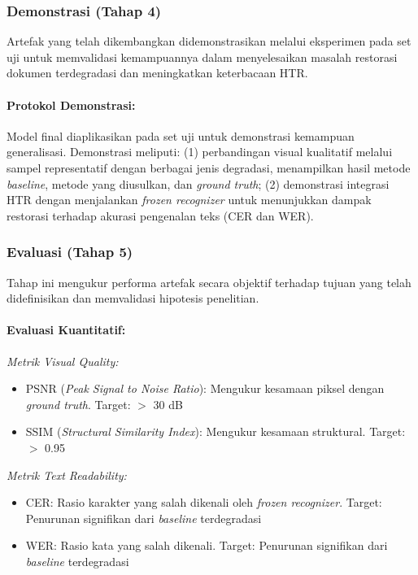 \documentclass[12pt,a4paper]{article}
\begin{document}

\subsubsection{Demonstrasi (Tahap 4)}
Artefak yang telah dikembangkan didemonstrasikan melalui eksperimen pada set uji untuk memvalidasi kemampuannya dalam menyelesaikan masalah restorasi dokumen terdegradasi dan meningkatkan keterbacaan HTR.

\paragraph{Protokol Demonstrasi:}
Model final diaplikasikan pada set uji untuk demonstrasi kemampuan generalisasi. Demonstrasi meliputi: (1) perbandingan visual kualitatif melalui sampel representatif dengan berbagai jenis degradasi, menampilkan hasil metode \textit{baseline}, metode yang diusulkan, dan \textit{ground truth}; (2) demonstrasi integrasi HTR dengan menjalankan \textit{frozen recognizer} untuk menunjukkan dampak restorasi terhadap akurasi pengenalan teks (CER dan WER).

\subsubsection{Evaluasi (Tahap 5)}
Tahap ini mengukur performa artefak secara objektif terhadap tujuan yang telah didefinisikan dan memvalidasi hipotesis penelitian.

\paragraph{Evaluasi Kuantitatif:}

\textit{Metrik Visual Quality:}
\begin{itemize}[leftmargin=*, nosep]
\item PSNR (\textit{Peak Signal to Noise Ratio}): Mengukur kesamaan piksel dengan \textit{ground truth}. Target: $>$ 30 dB
\item SSIM (\textit{Structural Similarity Index}): Mengukur kesamaan struktural. Target: $>$ 0.95
\end{itemize}

\textit{Metrik Text Readability:}
\begin{itemize}[leftmargin=*, nosep]
\item CER: Rasio karakter yang salah dikenali oleh \textit{frozen recognizer}. Target: Penurunan signifikan dari \textit{baseline} terdegradasi
\item WER: Rasio kata yang salah dikenali. Target: Penurunan signifikan dari \textit{baseline} terdegradasi
\end{itemize}
\end{document}
